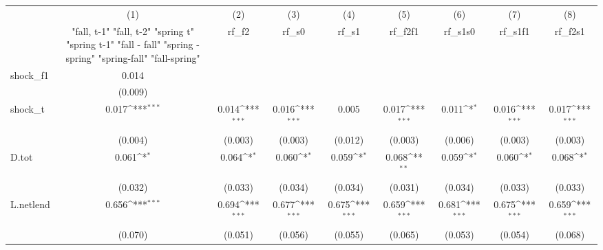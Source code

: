 {
\def\sym#1{\ifmmode^{#1}\else\(^{#1}\)\fi}
\begin{tabular}{l*{8}{c}}
\toprule
            &\multicolumn{1}{c}{(1)}&\multicolumn{1}{c}{(2)}&\multicolumn{1}{c}{(3)}&\multicolumn{1}{c}{(4)}&\multicolumn{1}{c}{(5)}&\multicolumn{1}{c}{(6)}&\multicolumn{1}{c}{(7)}&\multicolumn{1}{c}{(8)}\\
            &\multicolumn{1}{c}{  "fall, t-1" "fall, t-2" "spring t" "spring t-1"  "fall - fall" "spring - spring" "spring-fall" "fall-spring" }&\multicolumn{1}{c}{rf\_f2}&\multicolumn{1}{c}{rf\_s0}&\multicolumn{1}{c}{rf\_s1}&\multicolumn{1}{c}{rf\_f2f1}&\multicolumn{1}{c}{rf\_s1s0}&\multicolumn{1}{c}{rf\_s1f1}&\multicolumn{1}{c}{rf\_f2s1}\\
\midrule
shock\_f1    &       0.014         &                     &                     &                     &                     &                     &                     &                     \\
            &     (0.009)         &                     &                     &                     &                     &                     &                     &                     \\
\addlinespace
shock\_t     &       0.017\sym{***}&       0.014\sym{***}&       0.016\sym{***}&       0.005         &       0.017\sym{***}&       0.011\sym{*}  &       0.016\sym{***}&       0.017\sym{***}\\
            &     (0.004)         &     (0.003)         &     (0.003)         &     (0.012)         &     (0.003)         &     (0.006)         &     (0.003)         &     (0.003)         \\
\addlinespace
D.tot       &       0.061\sym{*}  &       0.064\sym{*}  &       0.060\sym{*}  &       0.059\sym{*}  &       0.068\sym{**} &       0.059\sym{*}  &       0.060\sym{*}  &       0.068\sym{*}  \\
            &     (0.032)         &     (0.033)         &     (0.034)         &     (0.034)         &     (0.031)         &     (0.034)         &     (0.033)         &     (0.033)         \\
\addlinespace
L.netlend   &       0.656\sym{***}&       0.694\sym{***}&       0.677\sym{***}&       0.675\sym{***}&       0.659\sym{***}&       0.681\sym{***}&       0.675\sym{***}&       0.659\sym{***}\\
            &     (0.070)         &     (0.051)         &     (0.056)         &     (0.055)         &     (0.065)         &     (0.053)         &     (0.054)         &     (0.068)         \\

\end{tabular}}
